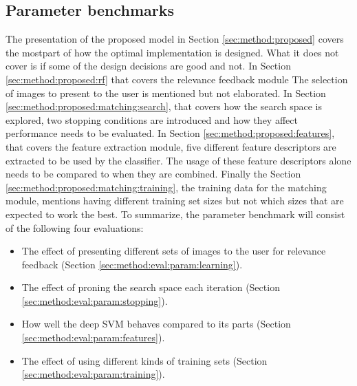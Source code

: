 \subsection{Parameter benchmarks}
\label{sec:method:eval:param}
\todo{}
The presentation of the proposed model in Section \ref{sec:method:proposed} covers the mostpart of how the optimal implementation is designed. What it does not cover is if some of the design decisions are good and not. In Section \ref{sec:method:proposed:rf} that covers the relevance feedback module The selection of images to present to the user is mentioned but not elaborated. In Section \ref{sec:method:proposed:matching:search}, that covers how the search space is explored, two stopping conditions are introduced and how they affect performance needs to be evaluated. In Section \ref{sec:method:proposed:features}, that covers the feature extraction module, five different feature descriptors are extracted to be used by the classifier. The usage of these feature descriptors alone needs to be compared to when they are combined. Finally the Section \ref{sec:method:proposed:matching:training}, the training data for the matching module, mentions having different training set sizes but not which sizes that are expected to work the best.
To summarize, the parameter benchmark will consist of the following four evaluations:
\begin{itemize}
\item The effect of presenting different sets of images to the user for relevance feedback (Section \ref{sec:method:eval:param:learning}).
\item The effect of proning the search space each iteration (Section \ref{sec:method:eval:param:stopping}).
\item How well the deep SVM behaves compared to its parts (Section \ref{sec:method:eval:param:features}).
\item The effect of using different kinds of training sets (Section \ref{sec:method:eval:param:training}).
\end{itemize}
\medskip

